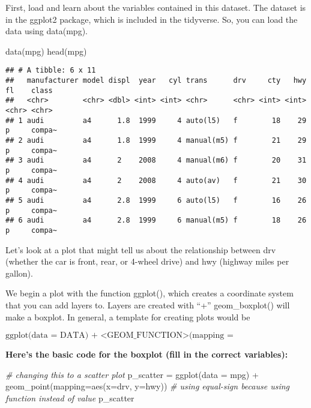 \documentclass[
]{article}
\newenvironment{Shaded}{\begin{snugshade}}{\end{snugshade}}
\newcommand{\AttributeTok}[1]{\textcolor[rgb]{0.77,0.63,0.00}{#1}}
\newcommand{\CommentTok}[1]{\textcolor[rgb]{0.56,0.35,0.01}{\textit{#1}}}
\newcommand{\FunctionTok}[1]{\textcolor[rgb]{0.00,0.00,0.00}{#1}}
\newcommand{\NormalTok}[1]{#1}
\newcommand{\OtherTok}[1]{\textcolor[rgb]{0.56,0.35,0.01}{#1}}
\newcommand{\SpecialCharTok}[1]{\textcolor[rgb]{0.00,0.00,0.00}{#1}}
\begin{document}
First, load and learn about the variables contained in this dataset. The
dataset is in the ggplot2 package, which is included in the tidyverse.
So, you can load the data using data(mpg).

\begin{Shaded}
\begin{Highlighting}[]
\FunctionTok{data}\NormalTok{(mpg)}
\FunctionTok{head}\NormalTok{(mpg)}
\end{Highlighting}
\end{Shaded}

\begin{verbatim}
## # A tibble: 6 x 11
##   manufacturer model displ  year   cyl trans      drv     cty   hwy fl    class 
##   <chr>        <chr> <dbl> <int> <int> <chr>      <chr> <int> <int> <chr> <chr> 
## 1 audi         a4      1.8  1999     4 auto(l5)   f        18    29 p     compa~
## 2 audi         a4      1.8  1999     4 manual(m5) f        21    29 p     compa~
## 3 audi         a4      2    2008     4 manual(m6) f        20    31 p     compa~
## 4 audi         a4      2    2008     4 auto(av)   f        21    30 p     compa~
## 5 audi         a4      2.8  1999     6 auto(l5)   f        16    26 p     compa~
## 6 audi         a4      2.8  1999     6 manual(m5) f        18    26 p     compa~
\end{verbatim}

Let's look at a plot that might tell us about the relationship between
drv (whether the car is front, rear, or 4-wheel drive) and hwy (highway
miles per gallon).

We begin a plot with the function ggplot(), which creates a coordinate
system that you can add layers to. Layers are created with ``+''
geom\_boxplot() will make a boxplot. In general, a template for creating
plots would be

\(\text{ggplot(data = DATA) + 
  <GEOM_FUNCTION>(mapping = aes(<MAPPINGS>))}\)

\textbf{Here's the basic code for the boxplot (fill in the correct
variables):}

\begin{Shaded}
\begin{Highlighting}[]
\CommentTok{\# changing this to a scatter plot }
\NormalTok{p\_scatter }\OtherTok{=} \FunctionTok{ggplot}\NormalTok{(}\AttributeTok{data =}\NormalTok{ mpg) }\SpecialCharTok{+} \FunctionTok{geom\_point}\NormalTok{(}\AttributeTok{mapping=}\FunctionTok{aes}\NormalTok{(}\AttributeTok{x=}\NormalTok{drv, }\AttributeTok{y=}\NormalTok{hwy))}
\CommentTok{\# using \textquotesingle{}equal{-}sign\textquotesingle{} because using function instead of value}
\NormalTok{p\_scatter}
\end{Highlighting}
\end{Shaded}
\end{document}
